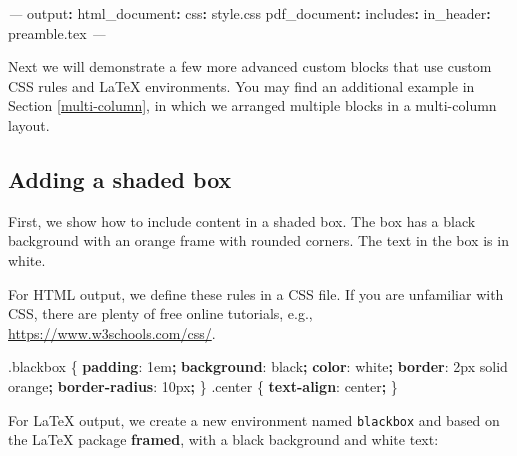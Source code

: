 \documentclass[
  11pt,
]{krantz}
\newenvironment{Shaded}{\begin{snugshade}}{\end{snugshade}}
\newcommand{\AttributeTok}[1]{\textcolor[rgb]{0.61,0.61,0.61}{#1}}
\newcommand{\ConstantTok}[1]{\textcolor[rgb]{0,0,0}{#1}}
\newcommand{\DataTypeTok}[1]{\textcolor[rgb]{0.27,0.27,0.27}{#1}}
\newcommand{\DecValTok}[1]{\textcolor[rgb]{0.06,0.06,0.06}{#1}}
\newcommand{\FunctionTok}[1]{\textcolor[rgb]{0,0,0}{#1}}
\newcommand{\KeywordTok}[1]{\textcolor[rgb]{0.27,0.27,0.27}{\textbf{#1}}}
\newcommand{\NormalTok}[1]{#1}
\newcommand{\OperatorTok}[1]{\textcolor[rgb]{0.43,0.43,0.43}{\textbf{#1}}}
\newcommand{\PreprocessorTok}[1]{\textcolor[rgb]{0.37,0.37,0.37}{\textit{#1}}}
\begin{document}
\begin{Shaded}
\begin{Highlighting}[]
\PreprocessorTok{---}
\FunctionTok{output}\KeywordTok{:}
\AttributeTok{  }\FunctionTok{html_document}\KeywordTok{:}
\AttributeTok{    }\FunctionTok{css}\KeywordTok{:}\AttributeTok{ style.css}
\AttributeTok{  }\FunctionTok{pdf_document}\KeywordTok{:}
\AttributeTok{    }\FunctionTok{includes}\KeywordTok{:}
\AttributeTok{      }\FunctionTok{in_header}\KeywordTok{:}\AttributeTok{ preamble.tex}
\PreprocessorTok{---}
\end{Highlighting}
\end{Shaded}

Next we will demonstrate a few more advanced custom blocks that use custom CSS rules and LaTeX environments. You may find an additional example in Section \ref{multi-column}, in which we arranged multiple blocks in a multi-column layout.

\hypertarget{block-shaded}{%
\subsection{Adding a shaded box}\label{block-shaded}}

First, we show how to include content in a shaded box. The box has a black background with an orange frame with rounded corners. The text in the box is in white.

For HTML output, we define these rules in a CSS file. If you are unfamiliar with CSS, there are plenty of free online tutorials, e.g., \url{https://www.w3schools.com/css/}.

\begin{Shaded}
\begin{Highlighting}[]
\FunctionTok{.blackbox}\NormalTok{ \{}
  \KeywordTok{padding}\NormalTok{: }\DecValTok{1}\DataTypeTok{em}\OperatorTok{;}
  \KeywordTok{background}\NormalTok{: }\ConstantTok{black}\OperatorTok{;}
  \KeywordTok{color}\NormalTok{: }\ConstantTok{white}\OperatorTok{;}
  \KeywordTok{border}\NormalTok{: }\DecValTok{2}\DataTypeTok{px} \DecValTok{solid} \ConstantTok{orange}\OperatorTok{;}
  \KeywordTok{border-radius}\NormalTok{: }\DecValTok{10}\DataTypeTok{px}\OperatorTok{;}
\NormalTok{\}}
\FunctionTok{.center}\NormalTok{ \{}
  \KeywordTok{text-align}\NormalTok{: }\DecValTok{center}\OperatorTok{;}
\NormalTok{\}}
\end{Highlighting}
\end{Shaded}

For LaTeX output, we create a new environment named \texttt{blackbox} and based on the LaTeX package \textbf{framed}, with a black background and white text:
\end{document}
